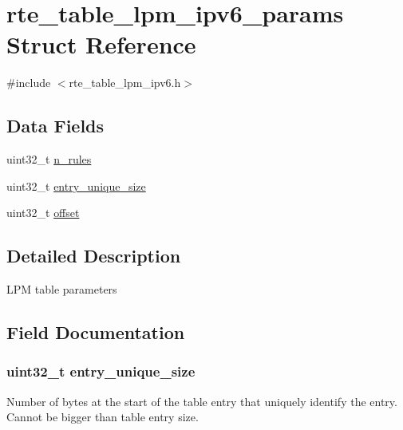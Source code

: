 \hypertarget{structrte__table__lpm__ipv6__params}{}\section{rte\+\_\+table\+\_\+lpm\+\_\+ipv6\+\_\+params Struct Reference}
\label{structrte__table__lpm__ipv6__params}


{\ttfamily \#include $<$rte\+\_\+table\+\_\+lpm\+\_\+ipv6.\+h$>$}

\subsection*{Data Fields}
\begin{DoxyCompactItemize}
\item 
uint32\+\_\+t \hyperlink{structrte__table__lpm__ipv6__params_a36f832c0360005ce685ffab87c3e188a}{n\+\_\+rules}
\item 
uint32\+\_\+t \hyperlink{structrte__table__lpm__ipv6__params_ada28744213d85f24111422f3a8b70725}{entry\+\_\+unique\+\_\+size}
\item 
uint32\+\_\+t \hyperlink{structrte__table__lpm__ipv6__params_a894bdfa2d603d8343f8ef01dda6fcd23}{offset}
\end{DoxyCompactItemize}


\subsection{Detailed Description}
L\+P\+M table parameters 

\subsection{Field Documentation}
\hypertarget{structrte__table__lpm__ipv6__params_ada28744213d85f24111422f3a8b70725}{}
\subsubsection[{entry\+\_\+unique\+\_\+size}]{\setlength{\rightskip}{0pt plus 5cm}uint32\+\_\+t entry\+\_\+unique\+\_\+size}\label{structrte__table__lpm__ipv6__params_ada28744213d85f24111422f3a8b70725}
Number of bytes at the start of the table entry that uniquely identify the entry. Cannot be bigger than table entry size. \hypertarget{structrte__table__lpm__ipv6__params_a36f832c0360005ce685ffab87c3e188a}{}
